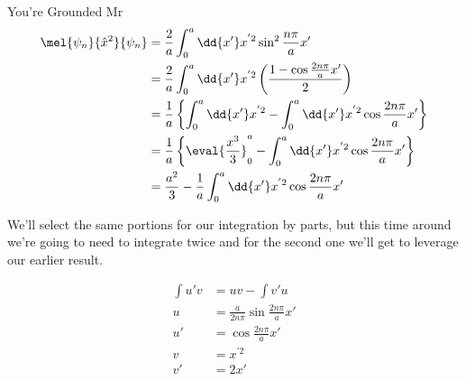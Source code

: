 \begin{answer}
\begin{answerpart}{You're Grounded Mr}
    \begin{equation}
      \begin{split}
        \mel{\psi_n}{\hat{x}^2}{\psi_n}
        &=
        \frac{2}{a}
        \int_0^a \dd{x'}
        x^{'2}
        \sin^2{\frac{n\pi}{a}x'}
        \\
        &=
        \frac{2}{a}
        \int_0^a \dd{x'}
        x^{'2}
        \left(\frac{1 - \cos{\frac{2n\pi}{a}x'}}{2}\right)
        \\
        &=
        \frac{1}{a}
        \left\{
        \int_0^a \dd{x'}
        x^{'2}
        -
        \int_0^a \dd{x'}
        x^{'2}
        \cos{\frac{2n\pi}{a}x'}
        \right\}
        \\
        &=
        \frac{1}{a}
        \left\{
        \eval{\frac{x^3}{3}}_0^a
        -
        \int_0^a \dd{x'}
        x^{'2}
        \cos{\frac{2n\pi}{a}x'}
        \right\}
        \\
        &=
        \frac{a^2}{3}
        -
        \frac{1}{a}
        \int_0^a \dd{x'}
        x^{'2}
        \cos{\frac{2n\pi}{a}x'}
        \\
      \end{split}
    \end{equation}

    We'll select the same portions for our integration by parts, but
    this time around we're going to need to integrate twice and for
    the second one we'll get to leverage our earlier result.

    \begin{equation}
      \begin{split}
        \int u'v &= uv - \int v'u\\
        u &= \frac{a}{2n\pi}\sin{\frac{2n\pi}{a}x'}\\
        u' &= \cos{\frac{2n\pi}{a}x'}\\
        v &= x^{'2}\\
        v' &= 2x' \\
      \end{split}
    \end{equation}
    

\end{answerpart}
\end{answer}
